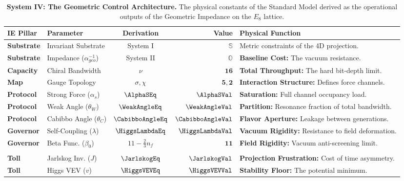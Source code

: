 \begin{table}[h]
\centering
\caption{\textbf{System IV: The Geometric Control Architecture.} The physical constants of the Standard Model derived as the operational outputs of the Geometric Impedance on the $E_8$ lattice.}
\label{tab:system_EffectiveFieldLimits}
\renewcommand{\arraystretch}{1.5}
\setlength{\tabcolsep}{6pt}
\begin{tabular}{@{} l l c r l @{}} 
\toprule
\textbf{IE Pillar} & \textbf{Parameter} & \textbf{Derivation} & \textbf{Value} & \textbf{Physical Function} \\
\midrule
\textbf{Substrate} & Invariant Substrate & System I & $\mathbb{S}$ & Metric constraints of the 4D projection. \\
\textbf{Substrate} & Impedance ($\alpha^{-1}_{geo}$) & System II & $\mathbb{O}$ & \textbf{Baseline Cost:} The vacuum resistance. \\
\midrule
\textbf{Capacity} & Chiral Bandwidth &
    $\nu$ & $\mathbf{16}$ & \textbf{Total Throughput:} The hard bit-depth limit. \\
\textbf{Map} & Gauge Topology &
    $\sigma, \chi$ & $\mathbf{5, 2}$ & \textbf{Interaction Structure:} Defines force channels. \\
\addlinespace
\textbf{Protocol} & Strong Force ($\alpha_s$) &
    $\AlphaSEq$ & $\mathbf{\AlphaSVal}$ & \textbf{Saturation:} Full channel occupancy load. \\
\textbf{Protocol} & Weak Angle ($\theta_W$) &
    $\WeakAngleEq$ & $\mathbf{\WeakAngleVal}$ & \textbf{Partition:} Resonance fraction of total bandwidth. \\
\textbf{Protocol} & Cabibbo Angle ($\theta_C$) &
    $\CabibboAngleEq$ & $\mathbf{\CabibboAngleVal}$ & \textbf{Flavor Aperture:} Leakage between generations. \\
\textbf{Governor} & Self-Coupling ($\lambda$) &
    $\HiggsLambdaEq$ & $\mathbf{\HiggsLambdaVal}$ & \textbf{Vacuum Rigidity:} Resistance to field deformation. \\
\textbf{Governor} & Beta Func. ($\beta_0$) & $11 - \frac{2}{3}n_f$ & $\mathbf{11}$ & \textbf{Field Rigidity:} Vacuum anti-screening limit. \\
\addlinespace
\multicolumn{5}{l}{\textit{The Thermodynamic Cost}} \\
\textbf{Toll} & Jarlskog Inv. ($J$) &
    $\JarlskogEq$ & $\mathbf{\JarlskogVal}$ & \textbf{Projection Frustration:} Cost of time asymmetry. \\
\textbf{Toll} & Higgs VEV ($v$) & 
    $\HiggsVEVEq$ & $\mathbf{\HiggsVEVVal}$ & \textbf{Stability Floor:} The potential minimum. \\

\end{tabular}
\end{table}
